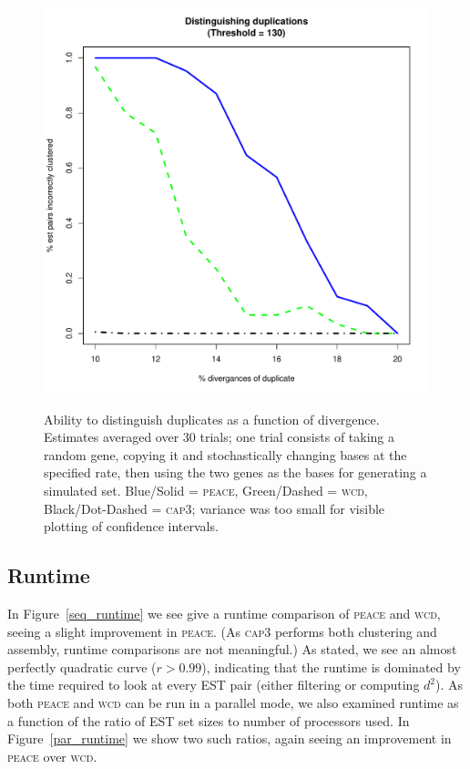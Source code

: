 \documentclass[a4paper,12pt]{article}
\begin{document}
\begin{appendix}
\begin{figure}[tbp]
\centerline{
\label{dups130}
\includegraphics[scale=0.35]{pics.d/duplicates_130.pdf}
}
\caption{Ability to distinguish duplicates as a function of
  divergence.  Estimates averaged over 30 trials; one trial consists
  of taking a random gene, copying it and stochastically changing bases
  at the specified rate, then using the two genes as the bases for
  generating a simulated set. Blue/Solid = \textsc{peace}, Green/Dashed = \textsc{wcd}, Black/Dot-Dashed = \textsc{cap3};
  variance was too small for visible plotting of
  confidence intervals.}
\end{figure}


\subsection{Runtime}
\label{rt_section}

In Figure~\ref{seq_runtime} we see give a runtime comparison of \textsc{peace} and \textsc{wcd},
seeing a slight improvement in \textsc{peace}.  (As \textsc{cap3} performs both
clustering and assembly, runtime comparisons are not meaningful.)  As
stated, we see an almost perfectly quadratic curve ($r > 0.99$),
indicating that the runtime is dominated by the time required to look
at every EST pair (either filtering or computing $d^2$).
As both \textsc{peace} and \textsc{wcd} can be run in a parallel mode, we also
examined runtime as a function of the ratio of EST set sizes to number
of processors used.  In Figure~\ref{par_runtime} we show two such ratios,
again seeing an improvement in \textsc{peace} over \textsc{wcd}.


\end{appendix}
\end{document}
